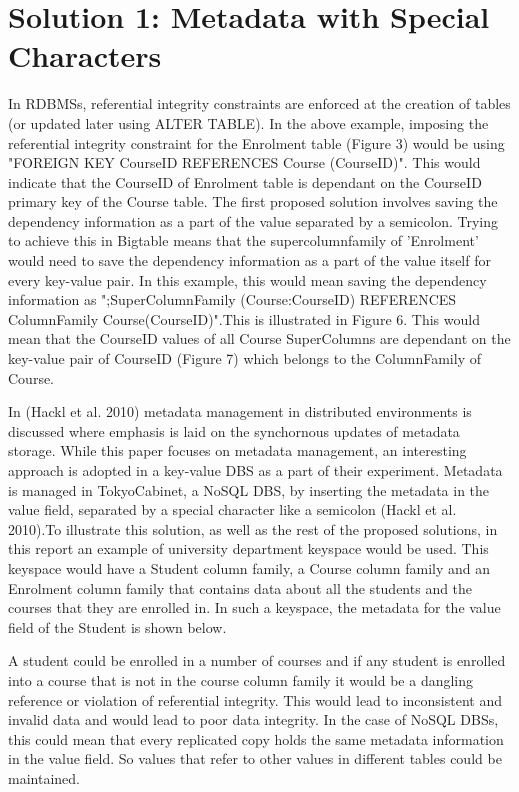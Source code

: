 \section{Solution 1:  Metadata with Special Characters}\label{s:sol1}

In RDBMSs, referential integrity constraints are enforced at the creation of
tables (or updated later using ALTER TABLE). In the above example, imposing the
referential integrity constraint for the Enrolment table (Figure 3) would be
using "FOREIGN KEY CourseID REFERENCES Course (CourseID)". This would indicate
that the CourseID of Enrolment table is dependant on the CourseID primary key of
the Course table.
The first proposed solution involves saving the dependency information as a part
of the value separated by a semicolon. Trying to achieve this in Bigtable means
that the supercolumnfamily of 'Enrolment' would need to save the dependency
information as a part of the value itself for every key-value pair. In this
example, this would mean saving the dependency information as
";SuperColumnFamily (Course:CourseID) REFERENCES ColumnFamily
Course(CourseID)".This is illustrated in Figure 6. This would mean that the
CourseID values of all Course SuperColumns are dependant on the key-value pair
of CourseID (Figure 7) which belongs to the ColumnFamily of Course.

In (Hackl et al. 2010) metadata management in distributed environments is
discussed where emphasis is laid on the synchornous updates of metadata storage.
While this paper focuses on metadata management, an interesting approach is
adopted in a key-value DBS as a part of their experiment. Metadata is managed in
TokyoCabinet, a NoSQL DBS, by inserting the metadata in the value field,
separated by a special character like a semicolon (Hackl et al. 2010).To
illustrate this solution, as well as the rest of the proposed solutions, in this
report an example of university department keyspace would be used. This keyspace
would have a Student column family, a Course column family and an Enrolment
column family that contains data about all the students and the courses that
they are enrolled in. In such a keyspace, the metadata for the value field of
the Student is shown below.

A student could be enrolled in a number of courses and if any student is
enrolled into a course that is not in the course column family it would be a
dangling reference or violation of referential integrity. This would lead to
inconsistent and invalid data and would lead to poor data integrity.
In the case of NoSQL DBSs, this could mean that every replicated copy holds the
same metadata information in the value field. So values that refer to other
values in different tables could be maintained.

